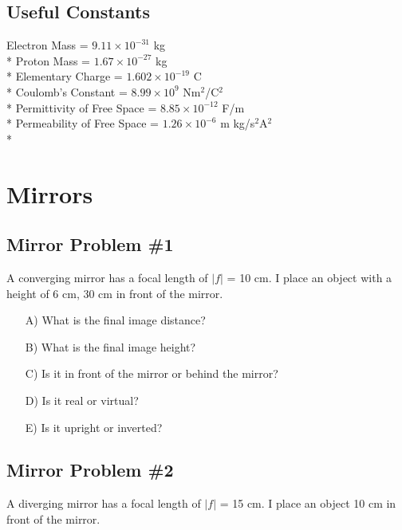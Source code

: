 \documentclass[11pt]{article}
\begin{document}
\maketitle
\tableofcontents
\hspace{30mm}

\subsection*{Useful Constants}
Electron Mass = $9.11 \times 10^{-31}$ kg \\*
Proton Mass = $1.67 \times 10^{-27}$ kg \\*
Elementary Charge = $1.602 \times 10^{-19}$ C \\*
Coulomb's Constant = $8.99 \times 10^9$ Nm$^2$/C$^2$ \\*
Permittivity of Free Space = $8.85 \times 10^{-12}$ F/m \\*
Permeability of Free Space = $1.26 \times 10^{-6}$ m kg/s$^2$A$^2$ \\*


\pagebreak
\section{Mirrors}

\subsection{Mirror Problem \#1}
A converging mirror has a focal length of $|f|$ = 10 cm.  I place an object with a height of 6 cm, 30 cm in front of the mirror.  

\begin{itemize}
\item[A)] What is the final image distance?
\item[B)] What is the final image height?
\item[C)] Is it in front of the mirror or behind the mirror?  
\item[D)] Is it real or virtual?
\item[E)] Is it upright or inverted?
\end{itemize}

\subsection{Mirror Problem \#2}
A diverging mirror has a focal length of $|f|$ = 15 cm.  I place an object 10 cm in front of the mirror.  
\end{document}
